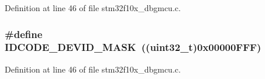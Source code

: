 Definition at line 46 of file stm32f10x\+\_\+dbgmcu.\+c.

\subsubsection[{\texorpdfstring{I\+D\+C\+O\+D\+E\+\_\+\+D\+E\+V\+I\+D\+\_\+\+M\+A\+SK}{IDCODE_DEVID_MASK}}]{\setlength{\rightskip}{0pt plus 5cm}\#define I\+D\+C\+O\+D\+E\+\_\+\+D\+E\+V\+I\+D\+\_\+\+M\+A\+SK~(({\bf uint32\+\_\+t})0x00000\+F\+F\+F)}\hypertarget{group___d_b_g_m_c_u___private___defines_gaeeece10cca80f3c632d3d77c3f2917b6}{}\label{group___d_b_g_m_c_u___private___defines_gaeeece10cca80f3c632d3d77c3f2917b6}


Definition at line 46 of file stm32f10x\+\_\+dbgmcu.\+c.

